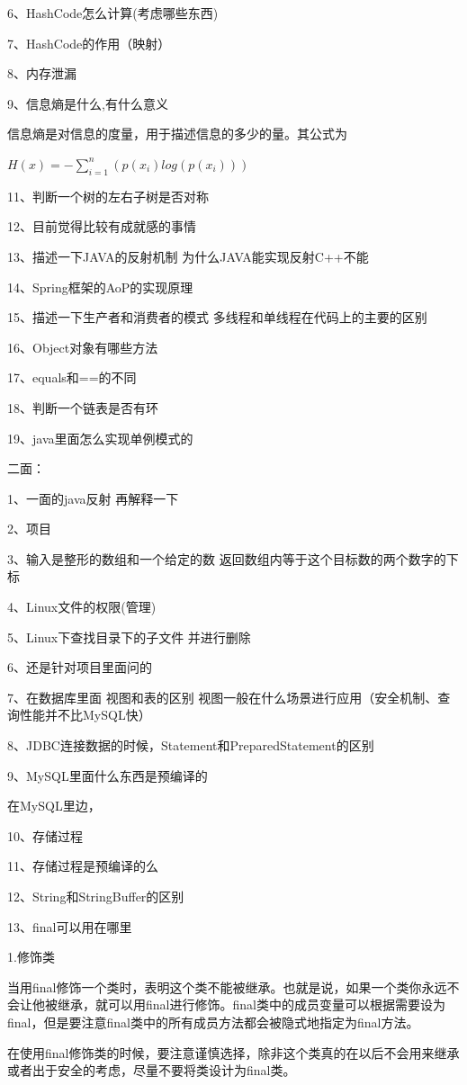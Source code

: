 \documentclass[UTF8]{ctexart}
\begin{document}
6、HashCode怎么计算(考虑哪些东西)

7、HashCode的作用（映射）

8、内存泄漏

9、信息熵是什么,有什么意义

信息熵是对信息的度量，用于描述信息的多少的量。其公式为

$H(x)=-\sum_{i=1}^n(p(x_i)log(p(x_i)))$


11、判断一个树的左右子树是否对称

12、目前觉得比较有成就感的事情

13、描述一下JAVA的反射机制 为什么JAVA能实现反射C++不能

14、Spring框架的AoP的实现原理

15、描述一下生产者和消费者的模式 多线程和单线程在代码上的主要的区别

16、Object对象有哪些方法

17、equals和==的不同



18、判断一个链表是否有环

19、java里面怎么实现单例模式的

二面：

1、一面的java反射 再解释一下

2、项目

3、输入是整形的数组和一个给定的数 返回数组内等于这个目标数的两个数字的下标

4、Linux文件的权限(管理)

5、Linux下查找目录下的子文件 并进行删除

6、还是针对项目里面问的

7、在数据库里面 视图和表的区别 视图一般在什么场景进行应用（安全机制、查询性能并不比MySQL快）

8、JDBC连接数据的时候，Statement和PreparedStatement的区别

9、MySQL里面什么东西是预编译的

在MySQL里边，

10、存储过程

11、存储过程是预编译的么

12、String和StringBuffer的区别

13、final可以用在哪里

1.修饰类

当用final修饰一个类时，表明这个类不能被继承。也就是说，如果一个类你永远不会让他被继承，就可以用final进行修饰。final类中的成员变量可以根据需要设为final，但是要注意final类中的所有成员方法都会被隐式地指定为final方法。

在使用final修饰类的时候，要注意谨慎选择，除非这个类真的在以后不会用来继承或者出于安全的考虑，尽量不要将类设计为final类。
\end{document}
